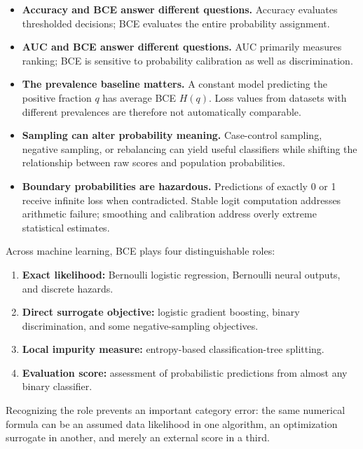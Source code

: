 \documentclass[11pt]{article}
\theoremstyle{definition}
\begin{document}
\begin{itemize}
  \item \textbf{Accuracy and BCE answer different questions.} Accuracy evaluates thresholded decisions; BCE evaluates the entire probability assignment.
  \item \textbf{AUC and BCE answer different questions.} AUC primarily measures ranking; BCE is sensitive to probability calibration as well as discrimination.
  \item \textbf{The prevalence baseline matters.} A constant model predicting the positive fraction $q$ has average BCE $H(q)$. Loss values from datasets with different prevalences are therefore not automatically comparable.
  \item \textbf{Sampling can alter probability meaning.} Case-control sampling, negative sampling, or rebalancing can yield useful classifiers while shifting the relationship between raw scores and population probabilities.
  \item \textbf{Boundary probabilities are hazardous.} Predictions of exactly 0 or 1 receive infinite loss when contradicted. Stable logit computation addresses arithmetic failure; smoothing and calibration address overly extreme statistical estimates.
\end{itemize}

\begin{keyidea}
Across machine learning, BCE plays four distinguishable roles:
\begin{enumerate}
  \item \textbf{Exact likelihood:} Bernoulli logistic regression, Bernoulli neural outputs, and discrete hazards.
  \item \textbf{Direct surrogate objective:} logistic gradient boosting, binary discrimination, and some negative-sampling objectives.
  \item \textbf{Local impurity measure:} entropy-based classification-tree splitting.
  \item \textbf{Evaluation score:} assessment of probabilistic predictions from almost any binary classifier.
\end{enumerate}
Recognizing the role prevents an important category error: the same numerical formula can be an assumed data likelihood in one algorithm, an optimization surrogate in another, and merely an external score in a third.
\end{keyidea}
\end{document}
